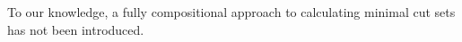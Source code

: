 To our knowledge, a fully compositional approach to calculating minimal cut sets has not been introduced.



















